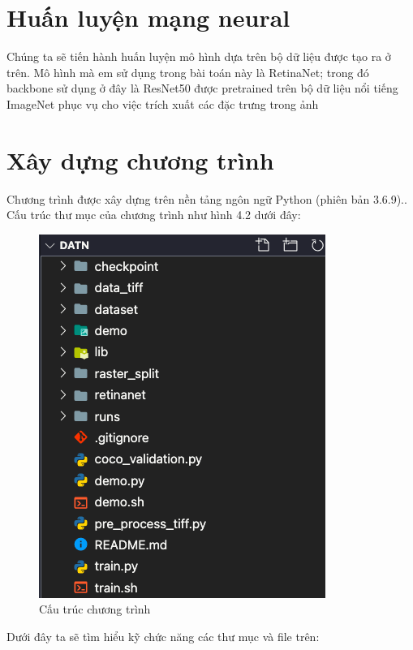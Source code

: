 \documentclass[a4paper, 12pt]{report}
\begin{document}
\section{Huấn luyện mạng neural}
Chúng ta sẽ tiến hành huấn luyện mô hình dựa trên bộ dữ liệu được tạo ra ở trên.  Mô hình mà em sử dụng trong bài toán này là RetinaNet; trong đó backbone sử dụng ở đây là ResNet50 được pretrained trên bộ dữ liệu nổi tiếng ImageNet phục vụ cho việc trích xuất các đặc trưng trong ảnh
\section{Xây dựng chương trình}
Chương trình được xây dựng trên nền tảng ngôn ngữ Python (phiên bản 3.6.9).. Cấu trúc thư mục của chương trình như hình 4.2 dưới đây: 
 \begin{figure}[!h]
	\centering
	\includegraphics[width=0.8\linewidth]{Images/tree_DATN}
	\caption{Cấu trúc chương trình}
	\label{fig:tree_DATN}
\end{figure}
Dưới đây ta sẽ tìm hiểu kỹ chức năng các thư mục và file trên:
\end{document}
